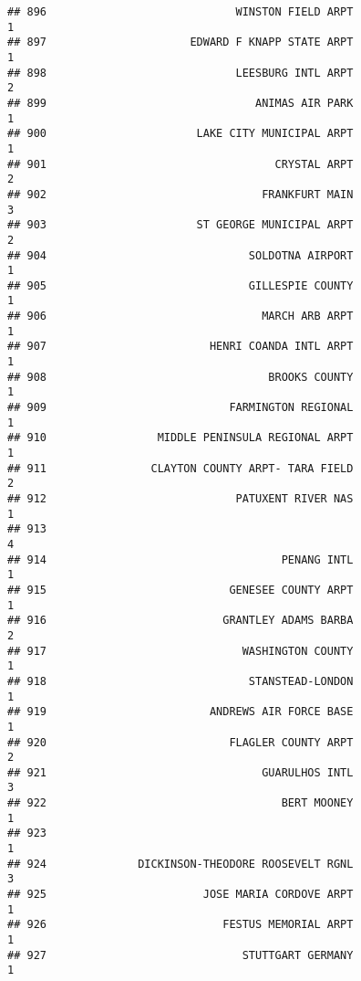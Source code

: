 \documentclass[
]{article}
\begin{document}
\begin{verbatim}
## 896                             WINSTON FIELD ARPT                           1
## 897                      EDWARD F KNAPP STATE ARPT                           1
## 898                             LEESBURG INTL ARPT                           2
## 899                                ANIMAS AIR PARK                           1
## 900                       LAKE CITY MUNICIPAL ARPT                           1
## 901                                   CRYSTAL ARPT                           2
## 902                                 FRANKFURT MAIN                           3
## 903                       ST GEORGE MUNICIPAL ARPT                           2
## 904                               SOLDOTNA AIRPORT                           1
## 905                               GILLESPIE COUNTY                           1
## 906                                 MARCH ARB ARPT                           1
## 907                         HENRI COANDA INTL ARPT                           1
## 908                                  BROOKS COUNTY                           1
## 909                            FARMINGTON REGIONAL                           1
## 910                 MIDDLE PENINSULA REGIONAL ARPT                           1
## 911                CLAYTON COUNTY ARPT- TARA FIELD                           2
## 912                             PATUXENT RIVER NAS                           1
## 913                                                                          4
## 914                                    PENANG INTL                           1
## 915                            GENESEE COUNTY ARPT                           1
## 916                           GRANTLEY ADAMS BARBA                           2
## 917                              WASHINGTON COUNTY                           1
## 918                               STANSTEAD-LONDON                           1
## 919                         ANDREWS AIR FORCE BASE                           1
## 920                            FLAGLER COUNTY ARPT                           2
## 921                                 GUARULHOS INTL                           3
## 922                                    BERT MOONEY                           1
## 923                                                                          1
## 924              DICKINSON-THEODORE ROOSEVELT RGNL                           3
## 925                        JOSE MARIA CORDOVE ARPT                           1
## 926                           FESTUS MEMORIAL ARPT                           1
## 927                              STUTTGART GERMANY                           1

\end{verbatim}
\end{document}
